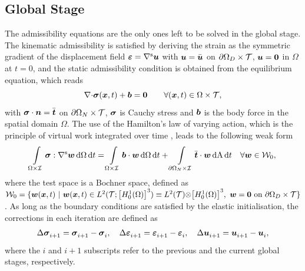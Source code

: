 \subsection{Global Stage}
The admissibility equations are the only ones left to be solved in the global stage. The kinematic admissibility is satisfied by deriving the strain as the symmetric gradient of the displacement field $\feps = \grads{\fu}$ with $\fu = \bar{\fu}$ on $\pOmegaD\times\cT$, $\fu=\fzero$ in $\Omega$ at $t=0$, and the static admissibility condition is obtained from the equilibrium equation, which reads \parencite{wunderlich2002mechanics}
\begin{equation}
	\div{\fsigma(\fx,t)}+\fb=\fzero \qquad \forall (\fx,t) \in \Omega \times \cT,
\end{equation}
{with $\fsigma \cdot \fn = \bar{\ft}$} on $\pOmegaN\times\cT$, $\fsigma$ is Cauchy stress and $\fb$ is the body force in the spatial domain $\Omega$. The use of the Hamilton{'s} law of varying action, which is the principle of virtual work integrated over time \parencite{gellin1988nonlinear}, leads to the following weak form
\begin{equation}
	\intST \fsigma:\grads{\fw} \d \Omega \d t= \intST \fb \cdot \fw \d \Omega \d t + \ds \intSTN \bar{\ft} \cdot \fw \d \rA \d t \quad \forall \fw \in \cW_0,
	\label{eq_equilibrium}
\end{equation}
where the test space is a Bochner space, defined as $\cW_0 = \{\fw(\fx,t) \ | \ \fw(\fx,t) \in
	L^2(\cT;{\left[H^1_{ 0}(\Omega)\right]}^3) \equiv L^2(\cT) { \otimes } {\left[H^1_{ 0}(\Omega)\right]}^3 , \ \fw =\fzero \text{ on } \partial \Omega_D\times\cT\}$. As long as the boundary conditions are satisfied by the elastic initialisation, the corrections in each iteration are defined as
\begin{equation}
	\Delta\stepk[]{\fsigma}=\stepk[]{\fsigma}-\stepi[]{\fsigma},\quad
	\Delta\stepk[]{\feps}=\stepk[]{\feps}-\stepi[]{\feps},\quad
	\Delta\stepk[]{\fu}=\stepk[]{\fu}-\stepi[]{\fu},
\end{equation}
where the $i$ and $i+1$ subscripts refer to the previous and the current global stages, respectively.

